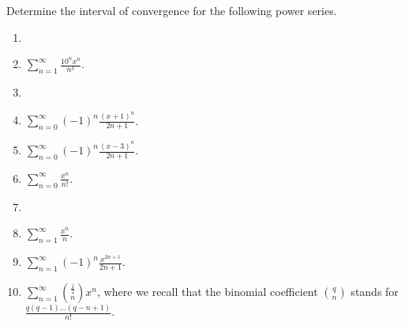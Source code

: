 Determine the interval of convergence for the following power series. 
\begin{enumerate}[ref={\fcProblemRef}]
\item 
\item $\displaystyle \sum \limits_{n= 1}^{\infty} \frac{ 10^nx^n}{n^3}$.

\item 
\item $\displaystyle \sum\limits_{n=0}^{\infty}(-1)^n \frac{(x+1)^n }{ 2n+1} $.

\answer{$x\in (-2, 0]$.}
\item $\displaystyle \sum\limits_{n=0}^{\infty}(-1)^n \frac{(x- 3)^n }{ 2n+1} $.

\answer{$x\in (2, 4]$.}
\item $\displaystyle \sum\limits_{n=0}^{\infty} \frac{x^n}{n!}$.

\item 
\item $\displaystyle \sum\limits_{n=1}^{\infty} \frac{x^n}{n}$.

\answer{converges for $|x|\in[-1,1)$.}
\item $\displaystyle\sum \limits_{n=1}^{\infty} (-1)^n\frac{x^{2n+1}}{2n+1}$.

\answer{converges for $|x|\in (-1, 1]$.}
\item $\displaystyle \sum\limits_{n=1}^{\infty} \binom{\frac{1}{2}}{n}x^{n}$, where we recall that the binomial coefficient $\displaystyle \binom{q}{n}$ stands for $\displaystyle\frac{q (q-1)\dots (q-n+1)}{n!}$.

\answer{converges for $x\in (-1,1]$. } 
\end{enumerate}